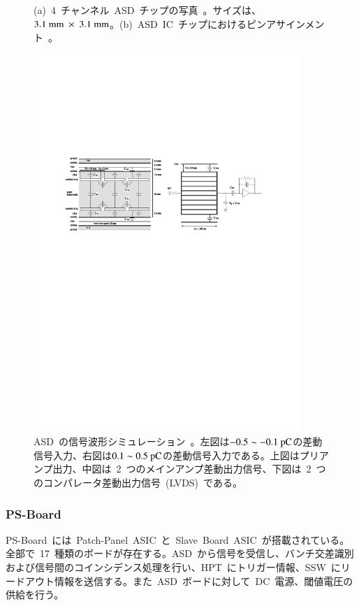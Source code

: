 \begin{figure}[H]
\begin{minipage}{0.49\hsize}
        \subcaption{}
        \end{minipage}
        \caption[ASD~チップの詳細]{(a)~4~チャンネル~ASD~チップの写真~\cite{URL:06}。サイズは、$3.1~\rm{mm}~\times~3.1~\rm{mm}$。(b)~ASD~IC~チップにおけるピンアサインメント~\cite{URL:06}。}\label{fig:ASD}
\end{figure}

\begin{figure}[H]
        \centering   
        \includegraphics[width=0.9\textwidth,page=2]{img/pdf/ASD.pdf}
        \caption[ASD~の信号波形シミュレーション]{ASD~の信号波形シミュレーション~\cite{URL:06}。左図は$\rm{-0.5\sim-0.1}~\rm{pC}$の差動信号入力、右図は$\rm{0.1\sim0.5}~\rm{pC}$の差動信号入力である。上図はプリアンプ出力、中図は~2~つのメインアンプ差動出力信号、下図は~2~つのコンパレータ差動出力信号~(LVDS)~である。}
        \label{fig:signal}
\end{figure}

\subsubsection{PS-Board}
PS-Board~には~Patch-Panel~ASIC~と~Slave~Board~ASIC~が搭載されている。全部で~17~種類のボードが存在する。ASD~から信号を受信し、バンチ交差識別および信号間のコインシデンス処理を行い、HPT~にトリガー情報、SSW~にリードアウト情報を送信する。また~ASD~ボードに対して~DC~電源、閾値電圧の供給を行う。

